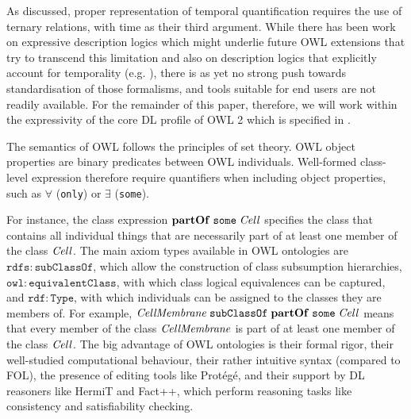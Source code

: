 
As discussed, proper representation of temporal quantification requires the use of ternary relations, with time as their third argument. While there has been work on expressive description logics which might underlie future OWL extensions that try to transcend this limitation \cite{Calvanese:1997} and also on description logics that explicitly account for temporality (e.g. \cite{Wolter:2001}), there is as yet no strong push towards standardisation of those formalisms, and tools suitable for end users are not readily available. For the remainder of this paper, therefore, we will work within the expressivity of the core DL profile of OWL 2 which is specified in \cite{OWL2:direct}.  

 
The semantics of OWL follows the principles of set theory. OWL object properties are binary predicates between OWL individuals. %
Well-formed class-level expression therefore require quantifiers when including object properties, such as $\forall$ (\texttt{only}) or $\exists$ (\texttt{some}).


For instance, the class expression $\mathrm{\mathbf{partOf}}\;\mathtt{some}\;\mathit{Cell}$ specifies the class that contains all individual things
that are necessarily part of at least one member of the class $\mathit{Cell}$.
The main axiom types available in OWL ontologies are $\mathtt{rdfs:subClassOf}$, which allow the construction of class subsumption hierarchies,
$\mathtt{owl:equivalentClass}$, with which class logical equivalences can be captured, and $\mathtt{rdf:Type}$, with which individuals can be assigned to the classes they are members of.
For example, $\mathit{CellMembrane}\;\mathtt{subClassOf}\;\mathrm{\mathbf{partOf}}\;\mathtt{some}\;\mathit{Cell}$
means that every member of the class $\mathit{CellMembrane}$ is
part of at least one member of the class $\mathit{Cell}$.
The big advantage of OWL ontologies is their formal rigor,
their well-studied computational behaviour, their rather
intuitive syntax (compared to FOL), the presence of editing tools like Prot\'eg\'e,
and their support by DL reasoners like HermiT and Fact++, which perform
reasoning tasks like consistency and satisfiability checking.
